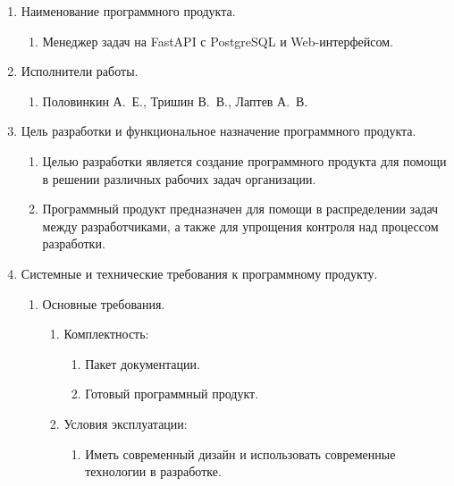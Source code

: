 \documentclass{altsu-report}
\begin{document}
\begin{enumerate}
    \item Наименование программного продукта.

    \begin{enumerate}
        \item Менеджер задач на FastAPI с PostgreSQL и Web-интерфейсом.
    \end{enumerate}

    \item Исполнители работы.

    \begin{enumerate}
        \item Половинкин А.~Е., Тришин В.~В., Лаптев А.~В.
    \end{enumerate}

    \item Цель разработки и функциональное назначение программного продукта.

    \begin{enumerate}
        \item Целью разработки является создание программного продукта для помощи в решении различных рабочих задач организации.

        \item Программный продукт предназначен для помощи в распределении задач между разработчиками, а также для упрощения контроля над процессом разработки.
    \end{enumerate}

    \item Системные и технические требования к программному продукту.

    \begin{enumerate}
        \item Основные требования.

        \begin{enumerate}
            \item Комплектность:

            \begin{enumerate}
                \item Пакет документации.

                \item Готовый программный продукт.
            \end{enumerate}

            \item Условия эксплуатации:

            \begin{enumerate}
                \item Иметь современный дизайн и использовать современные технологии в разработке.
            

\end{enumerate}
\end{enumerate}
\end{enumerate}
\end{enumerate}
\end{document}
